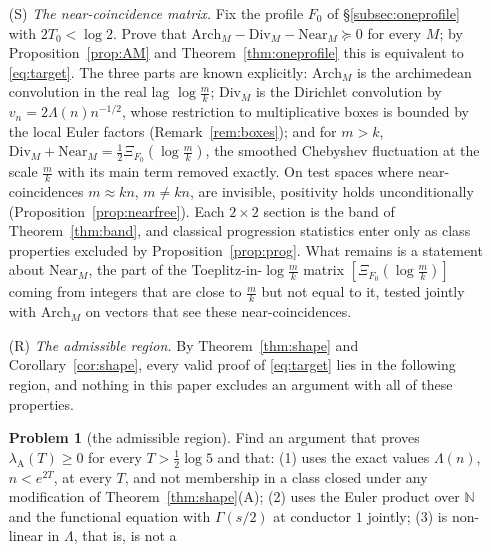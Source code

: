 \documentclass[11pt]{amsart}
\theoremstyle{definition}
\newtheorem{problem}[theorem]{Problem}
\theoremstyle{remark}
\newcommand{\N}{\mathbb N}
\newcommand{\PT}{\mathcal P_T}
\newcommand{\lamA}{\lambda_{\mathrm A}(T)}
\begin{document}
\begin{enumerate}
$e^{2T}$ frequencies. A first case is the inequality $(E_\gamma)$ of Proposition~\ref{prop:wit-Egamma} for one fixed
$\gamma$, which is necessary for \eqref{eq:target}. In polar-free form (Proposition~\ref{prop:sharp}) the problem is the
inequality $\mathcal F_T\le\mathfrak a^\sharp$ on $\PT$, whose archimedean side has bottom $\lambda^\sharp(T)\downarrow C_0+4$; for the
packets the threshold is exactly $m^\sharp(\gamma)$ (Proposition~\ref{prop:Egamma-exact}).
\item[(S)] \emph{The near-coincidence matrix.} Fix the profile $F_0$ of \S\ref{subsec:oneprofile} with $2T_0<\log2$. Prove that
$\mathrm{Arch}_M-\mathrm{Div}_M-\mathrm{Near}_M\succeq0$ for every $M$; by Proposition~\ref{prop:AM} and Theorem~\ref{thm:oneprofile}
this is equivalent to \eqref{eq:target}. The three parts are known explicitly: $\mathrm{Arch}_M$ is the archimedean convolution
in the real lag $\log\frac mk$; $\mathrm{Div}_M$ is the Dirichlet convolution by $v_n=2\Lambda(n)n^{-1/2}$, whose restriction to
multiplicative boxes is bounded by the local Euler factors (Remark~\ref{rem:boxes}); and for $m>k$,
$\mathrm{Div}_M+\mathrm{Near}_M=\frac12\Xi_{F_0}(\log\frac mk)$, the smoothed Chebyshev fluctuation at the scale $\frac mk$ with its
main term removed exactly. On test spaces where near-coincidences $m\approx kn$, $m\ne kn$, are invisible, positivity holds
unconditionally (Proposition~\ref{prop:nearfree}). Each $2\times2$ section is the band of Theorem~\ref{thm:band}, and classical
progression statistics enter only as class properties excluded by Proposition~\ref{prop:prog}. What remains is a statement about
$\mathrm{Near}_M$, the part of the Toeplitz-in-$\log\frac mk$ matrix $[\Xi_{F_0}(\log\frac mk)]$ coming from integers that are close
to $\frac mk$ but not equal to it, tested jointly with $\mathrm{Arch}_M$ on vectors that see these near-coincidences.
\item[(R)] \emph{The admissible region.} By Theorem~\ref{thm:shape} and Corollary~\ref{cor:shape}, every valid proof of
\eqref{eq:target} lies in the following region, and nothing in this paper excludes an argument with all of these properties.
\begin{problem}[the admissible region]\label{prob:region}
Find an argument that proves $\lamA\ge0$ for every $T>\frac12\log5$ and that: (1) uses the exact values $\Lambda(n)$, $n<e^{2T}$,
at every $T$, and not membership in a class closed under any modification of Theorem~\ref{thm:shape}(A); (2) uses the Euler product
over $\N$ and the functional equation with $\Gamma(s/2)$ at conductor $1$ jointly; (3) is non-linear in $\Lambda$, that is, is not a

\end{problem}
\end{enumerate}
\end{document}
